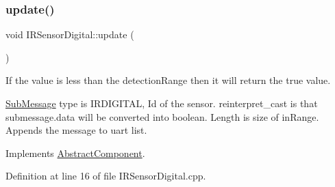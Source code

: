 \subsubsection{\texorpdfstring{update()}{update()}}
{\footnotesize\ttfamily void I\+R\+Sensor\+Digital\+::update (\begin{DoxyParamCaption}{ }\end{DoxyParamCaption})\hspace{0.3cm}{\ttfamily [virtual]}}



If the value is less than the detection\+Range then it will return the true value. 

\hyperlink{struct_sub_message}{Sub\+Message} type is I\+R\+D\+I\+G\+I\+T\+AL, Id of the sensor. reinterpret\+\_\+cast is that submessage.\+data will be converted into boolean. Length is size of in\+Range. Appends the message to uart list. 

Implements \hyperlink{class_abstract_component_af25a90b8ab213762221c3b358d9873f3}{Abstract\+Component}.



Definition at line 16 of file I\+R\+Sensor\+Digital.\+cpp.


